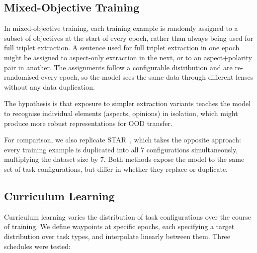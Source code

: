 \documentclass[12pt,a4paper]{report}
\begin{document}

\subsection{Mixed-Objective Training}

In mixed-objective training, each training example is randomly assigned to a subset of objectives at the start of every epoch, rather than always being used for full triplet extraction. A sentence used for full triplet extraction in one epoch might be assigned to aspect-only extraction in the next, or to an aspect+polarity pair in another. The assignments follow a configurable distribution and are re-randomised every epoch, so the model sees the same data through different lenses without any data duplication.

The hypothesis is that exposure to simpler extraction variants teaches the model to recognise individual elements (aspects, opinions) in isolation, which might produce more robust representations for OOD transfer.

For comparison, we also replicate STAR~\cite{xie2025star}, which takes the opposite approach: every training example is duplicated into all 7 configurations simultaneously, multiplying the dataset size by 7. Both methods expose the model to the same set of task configurations, but differ in whether they replace or duplicate.

\subsection{Curriculum Learning}

Curriculum learning varies the distribution of task configurations over the course of training. We define waypoints at specific epochs, each specifying a target distribution over task types, and interpolate linearly between them. Three schedules were tested:
\end{document}
